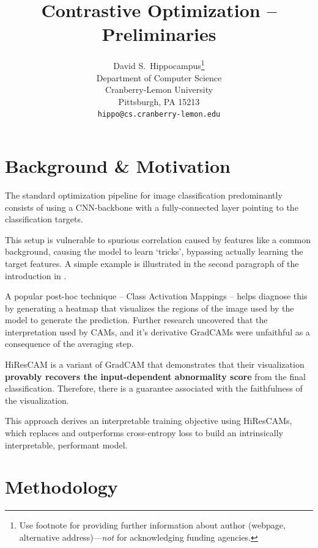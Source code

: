 \documentclass{article}
\title{Contrastive Optimization -- Preliminaries}
\author{%
  David S.~Hippocampus\thanks{Use footnote for providing further information
    about author (webpage, alternative address)---\emph{not} for acknowledging
    funding agencies.} \\
  Department of Computer Science\\
  Cranberry-Lemon University\\
  Pittsburgh, PA 15213 \\
  \texttt{hippo@cs.cranberry-lemon.edu} \\
}
\begin{document}
\maketitle




\section{Background \& Motivation}

The standard optimization pipeline for image classification predominantly consists of using a CNN-backbone with a fully-connected layer pointing to the classification targets.

This setup is vulnerable to spurious correlation caused by features like a common background, causing the model to learn `tricks', bypassing actually learning the target features. A simple example is illustrated in the second paragraph of the introduction in \cite{arjovsky2020invariantriskminimization}.

A popular post-hoc technique -- Class Activation Mappings \citep{zhou2016learning} -- helps diagnose this by generating a heatmap that visualizes the regions of the image used by the model to generate the prediction. Further research uncovered that the interpretation used by CAMs, and it's derivative GradCAMs were unfaithful as a consequence of the averaging step.

HiResCAM \citep{draelos2020use} is a variant of GradCAM \citep{selvaraju2017grad} that demonstrates that their visualization \textbf{provably recovers the input-dependent abnormality score} from the final classification. Therefore, there is a guarantee associated with the faithfulness of the visualization.

This approach derives an interpretable training objective using HiResCAMs, which replaces and outperforms cross-entropy loss to build an intrinsically interpretable, performant model.

\section{Methodology}
\end{document}
